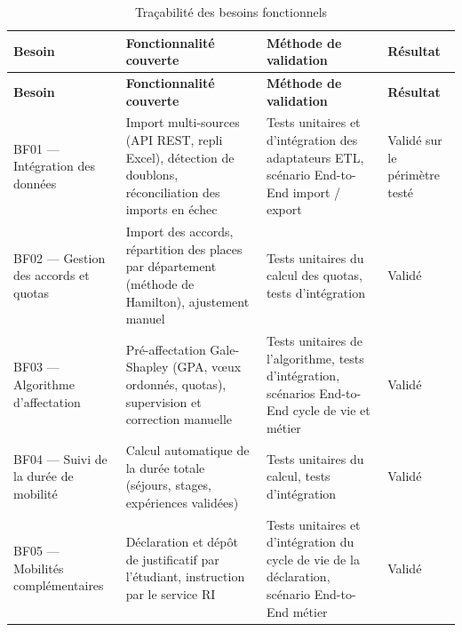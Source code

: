 \begin{longtable}{|p{2.8cm}|p{4.6cm}|p{4.4cm}|p{2.6cm}|}

\caption{Traçabilité des besoins fonctionnels}
\label{tab:tracabilite-bf} \\

\hline

\rowcolor{gray!20}

\textbf{Besoin} &
\textbf{Fonctionnalité couverte} &
\textbf{Méthode de validation} &
\textbf{Résultat} \\

\hline

\endfirsthead

\hline

\rowcolor{gray!20}

\textbf{Besoin} &
\textbf{Fonctionnalité couverte} &
\textbf{Méthode de validation} &
\textbf{Résultat} \\

\hline

\endhead

BF01 --- Intégration des données &
Import multi-sources (API REST, repli Excel), détection de doublons, réconciliation des imports en échec &
Tests unitaires et d'intégration des adaptateurs ETL, scénario End-to-End import / export &
Validé sur le périmètre testé \\

\hline

BF02 --- Gestion des accords et quotas &
Import des accords, répartition des places par département (méthode de Hamilton), ajustement manuel &
Tests unitaires du calcul des quotas, tests d'intégration  &
Validé \\

\hline

BF03 --- Algorithme d'affectation &
Pré-affectation Gale-Shapley (GPA, vœux ordonnés, quotas), supervision et correction manuelle &
Tests unitaires de l'algorithme, tests d'intégration, scénarios End-to-End cycle de vie et métier  &
Validé \\

\hline

BF04 --- Suivi de la durée de mobilité &
Calcul automatique de la durée totale (séjours, stages, expériences validées) &
Tests unitaires du calcul, tests d'intégration  &
Validé \\

\hline

BF05 --- Mobilités complémentaires &
Déclaration et dépôt de justificatif par l'étudiant, instruction par le service RI &
Tests unitaires et d'intégration du cycle de vie de la déclaration, scénario End-to-End métier &
Validé \\


\end{longtable}
